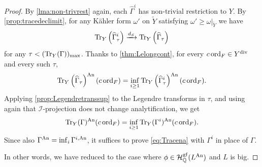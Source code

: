 \begin{proof}
    By \cref{lma:non-trivrest} again, each $\widehat{\Gamma}^{i}$ has non-trivial restriction to $Y$. By \cref{prop:tracedeclimit}, for any K\"ahler form $\omega'$ on $\widetilde{Y}$ satisfying $\omega'\geq \omega|_{\widetilde{Y}}$ we have
    \[
    \operatorname{Tr}_Y \left( \widehat{\Gamma}^{i}_{\tau} \right)\xrightarrow{d_S} \operatorname{Tr}_Y \left( \widehat{\Gamma}_{\tau}\right)
    \]
    for any $\tau<(\operatorname{Tr}_Y(\Gamma))_{\max}$. Thanks to \cref{thm:Lelongcont}, for every $c\operatorname{ord}_F\in Y^{\operatorname{div}}$ and every such $\tau$,
    \[
    \operatorname{Tr}_Y \left( \widehat{\Gamma}_{\tau} \right)^{\mathrm{An}}(c\operatorname{ord}_F)=\inf_{i\geq 1}\operatorname{Tr}_Y \left( \widehat{\Gamma}^{i}_{\tau} \right)^{\mathrm{An}}(c\operatorname{ord}_F).
    \]
    Applying \cref{prop:Legendretranssup} to the Legendre transforms in $\tau$, and using again that $\mathcal{I}$-projection does not change analytification, we get
    \[
    \operatorname{Tr}_Y(\Gamma)^{\mathrm{An}}(c\operatorname{ord}_F)=\inf_{i\geq 1}\operatorname{Tr}_Y(\Gamma^i)^{\mathrm{An}}(c\operatorname{ord}_F).
    \]
    Since also $\Gamma^{\mathrm{An}}=\inf_i \Gamma^{i,\mathrm{An}}$, it suffices to prove \eqref{eq:Tracena} with $\Gamma^i$ in place of $\Gamma$.

    In other words, we have reduced to the case where $\phi\in \mathcal{H}^{\mathrm{gf}}_{\mathbb{Q}}(L^{\mathrm{An}})$ and $L$ is big.


\end{proof}
